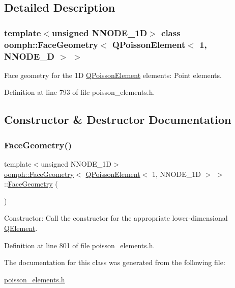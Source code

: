 \subsection{Detailed Description}
\subsubsection*{template$<$unsigned N\+N\+O\+D\+E\+\_\+1D$>$\newline
class oomph\+::\+Face\+Geometry$<$ Q\+Poisson\+Element$<$ 1, N\+N\+O\+D\+E\+\_\+D $>$ $>$}

Face geometry for the 1D \hyperlink{classoomph_1_1QPoissonElement}{Q\+Poisson\+Element} elements\+: Point elements. 

Definition at line 793 of file poisson\+\_\+elements.\+h.



\subsection{Constructor \& Destructor Documentation}
\mbox{\label{classoomph_1_1FaceGeometry_3_01QPoissonElement_3_011_00_01NNODE__1D_01_4_01_4_afd5f5f3ccd00da5c68f1e35c11f91c0f}} 
\subsubsection{\texorpdfstring{Face\+Geometry()}{FaceGeometry()}}
{\footnotesize\ttfamily template$<$unsigned N\+N\+O\+D\+E\+\_\+1D$>$ \\
\hyperlink{classoomph_1_1FaceGeometry}{oomph\+::\+Face\+Geometry}$<$ \hyperlink{classoomph_1_1QPoissonElement}{Q\+Poisson\+Element}$<$ 1, N\+N\+O\+D\+E\+\_\+1D $>$ $>$\+::\hyperlink{classoomph_1_1FaceGeometry}{Face\+Geometry} (\begin{DoxyParamCaption}{ }\end{DoxyParamCaption})\hspace{0.3cm}{\ttfamily [inline]}}



Constructor\+: Call the constructor for the appropriate lower-\/dimensional \hyperlink{classoomph_1_1QElement}{Q\+Element}. 



Definition at line 801 of file poisson\+\_\+elements.\+h.



The documentation for this class was generated from the following file\+:\begin{DoxyCompactItemize}
\item 
\hyperlink{poisson__elements_8h}{poisson\+\_\+elements.\+h}\end{DoxyCompactItemize}
